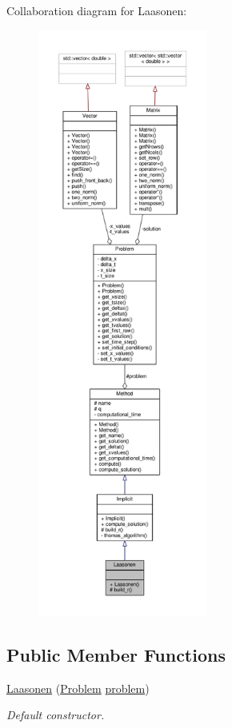 Collaboration diagram for Laasonen\+:
\nopagebreak
\begin{figure}[H]
\begin{center}
\leavevmode
\includegraphics[height=550pt]{classLaasonen__coll__graph}
\end{center}
\end{figure}
\subsection*{Public Member Functions}
\begin{DoxyCompactItemize}
\item 
\hyperlink{classLaasonen_a1ed879786dc74b8c2ba86a1deb167e5a}{Laasonen} (\hyperlink{classProblem}{Problem} \hyperlink{classMethod_a29a08a679b5d30a8c813766308205041}{problem})
\begin{DoxyCompactList}\small\item\em Default constructor. \end{DoxyCompactList}\end{DoxyCompactItemize}
